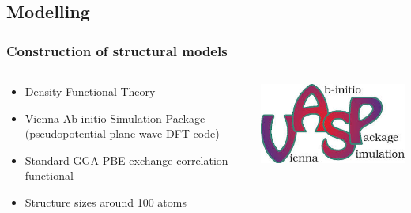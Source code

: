 \documentclass[noamsthm,8pt,t,xcolor={dvipsnames}]{beamer}
\begin{document}
\begin{frame}
\begin{columns}
\begin{column}{0.4\textwidth}
\begin{center}
         \end{center}
      \end{column}
   \end{columns}
\end{frame}

\subsection{Modelling}
\begin{frame}
   \frametitle{Construction of structural models}
   \vspace{-0.3cm}
   \begin{columns}
      \begin{column}{0.8\textwidth}
         \begin{itemize}
            \item Density Functional Theory
            \item Vienna Ab initio Simulation Package (pseudopotential plane wave DFT code)
            \item Standard GGA PBE exchange-correlation functional
            \item Structure sizes around 100 atoms
         \end{itemize}
      \end{column}
      \begin{column}{0.2\textwidth}
         \begin{center}
            \includegraphics[width=0.9\linewidth]{figures/VASP.jpg}
         \end{center}
      \end{column}
   \end{columns}

   \pause


\end{frame}
\end{document}
